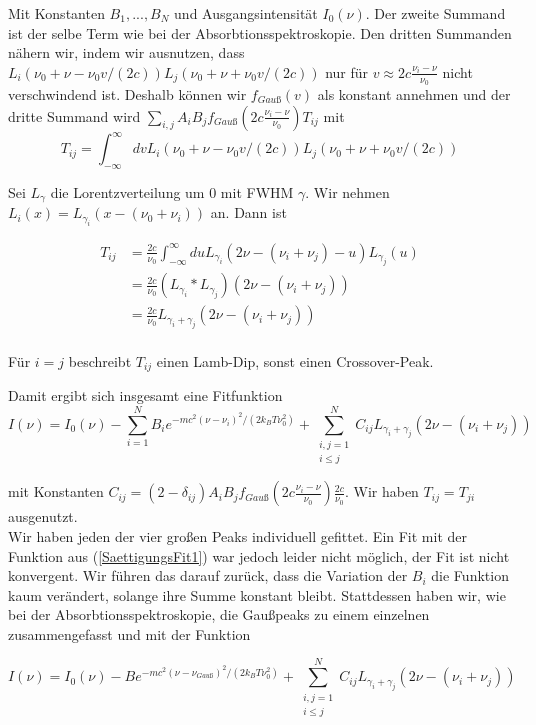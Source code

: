 \documentclass[a4paper,parskip]{scrartcl}
\begin{document}
Mit Konstanten $B_1, ..., B_N$ und Ausgangsintensität $I_0(\nu)$. Der zweite Summand ist der selbe Term wie bei der Absorbtionsspektroskopie. Den dritten Summanden nähern wir, indem wir ausnutzen, dass  $L_i(\nu_0+\nu-\nu_0 v/(2c)) L_j(\nu_0+\nu+\nu_0 v/(2c))$ nur für $v \approx 2c \frac{\nu_i-\nu}{\nu_0}$ nicht verschwindend ist. Deshalb können wir $f_{Gauß}(v)$ als konstant annehmen und der dritte Summand wird $\sum_{i,j} A_iB_j f_{Gauß}(2c \frac{\nu_i-\nu}{\nu_0}) T_{ij}$ mit
$$T_{ij}=\int_{-\infty}^\infty dv L_i(\nu_0+\nu-\nu_0 v/(2c)) L_j(\nu_0+\nu+\nu_0 v/(2c))$$


Sei $L_\gamma$ die Lorentzverteilung um 0 mit FWHM $\gamma$. Wir nehmen $L_i(x) = L_{\gamma_i}(x-(\nu_0+\nu_i))$ an. Dann ist

\begin{align*}
T_{ij} &= \frac{2c}{\nu_0}\int_{-\infty}^\infty du L_{\gamma_i}(2\nu-(\nu_i+\nu_j)-u)L_{\gamma_j}(u)\\
&= \frac{2c}{\nu_0} (L_{\gamma_i} * L_{\gamma_j})(2\nu-(\nu_i+\nu_j)) \\
&= \frac{2c}{\nu_0} L_{\gamma_i+\gamma_j}(2\nu-(\nu_i+\nu_j)) \\
\end{align*}

Für $i=j$ beschreibt $T_{ij}$ einen Lamb-Dip, sonst einen Crossover-Peak. 

Damit ergibt sich insgesamt eine Fitfunktion
\begin{equation}
I(\nu) = I_0(\nu)-\sum_{i=1}^N B_i e^{-mc^2(\nu-\nu_i)^2/(2k_BT\nu_0^2)} +\sum_{\substack{i,j=1\\i\leq j}}^N C_{ij} L_{\gamma_i+\gamma_j}(2\nu-(\nu_i+\nu_j))
\label{SaettigungsFit1}
\end{equation}


mit Konstanten $C_{ij} = (2-\delta_{ij})A_iB_jf_{Gauß}(2c \frac{\nu_i-\nu}{\nu_0})\frac{2c}{\nu_0}$. Wir haben $T_{ij}=T_{ji}$ ausgenutzt.\\

Wir haben jeden der vier großen Peaks individuell gefittet. Ein Fit mit der Funktion aus (\ref{SaettigungsFit1}) war jedoch leider nicht möglich, der Fit ist nicht konvergent. Wir führen das darauf zurück, dass die Variation der $B_i$ die Funktion kaum verändert, solange ihre Summe konstant bleibt. Stattdessen haben wir, wie bei der Absorbtionsspektroskopie, die Gaußpeaks zu einem einzelnen zusammengefasst und mit der Funktion

 \begin{equation}
I(\nu) = I_0(\nu)-B e^{-mc^2(\nu-\nu_{Gauß})^2/(2k_BT\nu_0^2)} +\sum_{\substack{i,j=1\\i\leq j}}^N C_{ij} L_{\gamma_i+\gamma_j}(2\nu-(\nu_i+\nu_j))
\label{SaettigungsFit2}
\end{equation}
\end{document}
